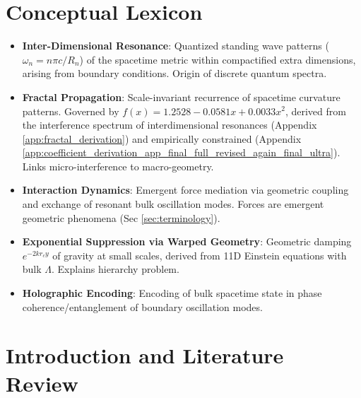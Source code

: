\documentclass[12pt, a4paper]{article} %
\begin{document}
\section*{Conceptual Lexicon}
\begin{itemize}
    \item \textbf{Inter-Dimensional Resonance}: Quantized standing wave patterns (\(\omega_n = n\pi c / R_n\)) of the spacetime metric within compactified extra dimensions, arising from boundary conditions. Origin of discrete quantum spectra.
    \item \textbf{Fractal Propagation}: Scale-invariant recurrence of spacetime curvature patterns. Governed by \(f(x) = 1.2528 - 0.0581x + 0.0033x^2\), derived from the interference spectrum of interdimensional resonances (Appendix \ref{app:fractal_derivation}) and empirically constrained (Appendix \ref{app:coefficient_derivation_app_final_full_revised_again_final_ultra}). Links micro-interference to macro-geometry.
    \item \textbf{Interaction Dynamics}: Emergent force mediation via geometric coupling and exchange of resonant bulk oscillation modes. Forces are emergent geometric phenomena (Sec \ref{sec:terminology}).
    \item \textbf{Exponential Suppression via Warped Geometry}: Geometric damping \(e^{-2kr_c y}\) of gravity at small scales, derived from 11D Einstein equations with bulk \(\Lambda\). Explains hierarchy problem.
    \item \textbf{Holographic Encoding}: Encoding of bulk spacetime state in phase coherence/entanglement of boundary oscillation modes.
\end{itemize}

\section{Introduction and Literature Review}
\label{sec:introduction}
\end{document}
